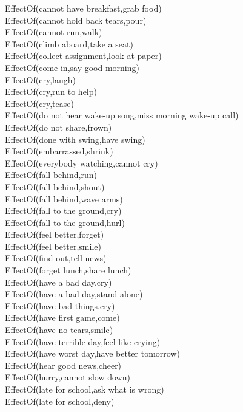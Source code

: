 \begin{multicols}{2}
\begin{footnotesize}
EffectOf(cannot have breakfast,grab food) \\
EffectOf(cannot hold back tears,pour) \\
EffectOf(cannot run,walk) \\
EffectOf(climb aboard,take a seat) \\
EffectOf(collect assignment,look at paper) \\
EffectOf(come in,say good morning) \\
EffectOf(cry,laugh) \\
EffectOf(cry,run to help) \\
EffectOf(cry,tease) \\
EffectOf(do not hear wake-up song,miss morning wake-up call) \\
EffectOf(do not share,frown) \\
EffectOf(done with swing,have swing) \\
EffectOf(embarrassed,shrink) \\
EffectOf(everybody watching,cannot cry) \\
EffectOf(fall behind,run) \\
EffectOf(fall behind,shout) \\
EffectOf(fall behind,wave arms) \\
EffectOf(fall to the ground,cry) \\
EffectOf(fall to the ground,hurl) \\
EffectOf(feel better,forget) \\
EffectOf(feel better,smile) \\
EffectOf(find out,tell news) \\
EffectOf(forget lunch,share lunch) \\
EffectOf(have a bad day,cry) \\
EffectOf(have a bad day,stand alone) \\
EffectOf(have bad things,cry) \\
EffectOf(have first game,come) \\
EffectOf(have no tears,smile) \\
EffectOf(have terrible day,feel like crying) \\
EffectOf(have worst day,have better tomorrow) \\
EffectOf(hear good news,cheer) \\
EffectOf(hurry,cannot slow down) \\
EffectOf(late for school,ask what is wrong) \\
EffectOf(late for school,deny) \\

\end{footnotesize}
\end{multicols}
